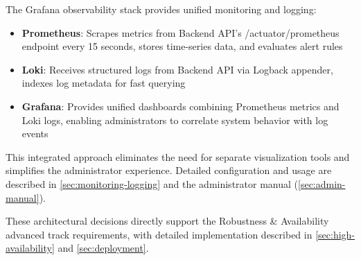 The Grafana observability stack provides unified monitoring and logging:

\begin{itemize}
    \item \textbf{Prometheus}: Scrapes metrics from Backend API's /actuator/prometheus endpoint every 15 seconds, stores time-series data, and evaluates alert rules
    \item \textbf{Loki}: Receives structured logs from Backend API via Logback appender, indexes log metadata for fast querying
    \item \textbf{Grafana}: Provides unified dashboards combining Prometheus metrics and Loki logs, enabling administrators to correlate system behavior with log events
\end{itemize}

This integrated approach eliminates the need for separate visualization tools and simplifies the administrator experience. Detailed configuration and usage are described in \cref{sec:monitoring-logging} and the administrator manual (\cref{sec:admin-manual}).

These architectural decisions directly support the Robustness \& Availability advanced track requirements, with detailed implementation described in \cref{sec:high-availability} and \cref{sec:deployment}.
